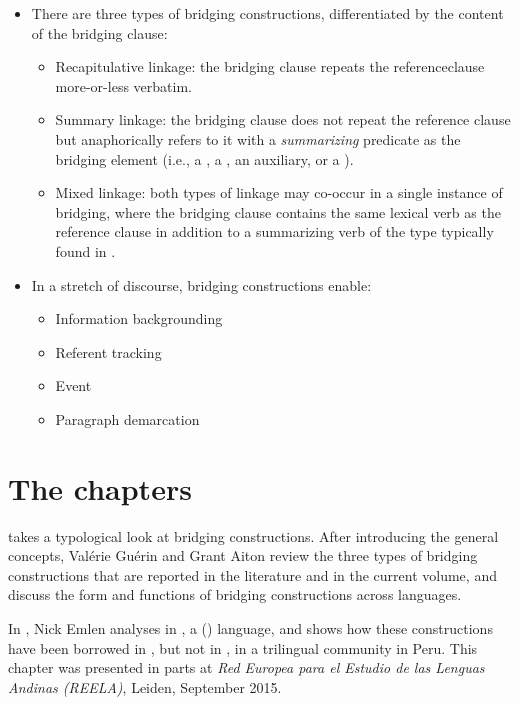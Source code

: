 \begin{refsection}
 \begin{itemize}  
\item There are three types of bridging constructions, differentiated by the content of the bridging clause: 
\begin{itemize}
\item Recapitulative linkage: the bridging clause repeats the reference\linebreak clause more-or-less verbatim. 
\item  Summary linkage: the bridging clause does not repeat the reference clause but anaphorically refers to it with a \textit{summarizing} predicate as the bridging element (i.e., a , a , an auxiliary, or a ). 
\item Mixed linkage: both types of linkage may co-occur in a single instance of bridging, where the bridging clause contains the same lexical verb as the reference clause in addition to a summarizing verb of the type typically found in .
\end{itemize}
\end{itemize}

 \begin{itemize} 
\item  In a stretch of discourse, bridging constructions enable:
\begin{itemize}
\item  Information backgrounding
\item  Referent tracking
\item  Event  
\item  Paragraph demarcation
\end{itemize}
\end{itemize}


\section*{The chapters}

 takes a typological look at bridging constructions. After introducing the general concepts, Valérie Guérin and Grant Aiton review the three types of bridging constructions that are reported in the literature and in the current volume, and discuss the form and functions of bridging constructions across languages. 

In , Nick Emlen analyses  in , a  () language, and shows how these constructions have been borrowed in , but not in , in a trilingual community in Peru. This chapter was presented in parts at \textit{Red Europea para el Estudio de las Lenguas Andinas (REELA)}, Leiden, September 2015. 


\end{refsection}
